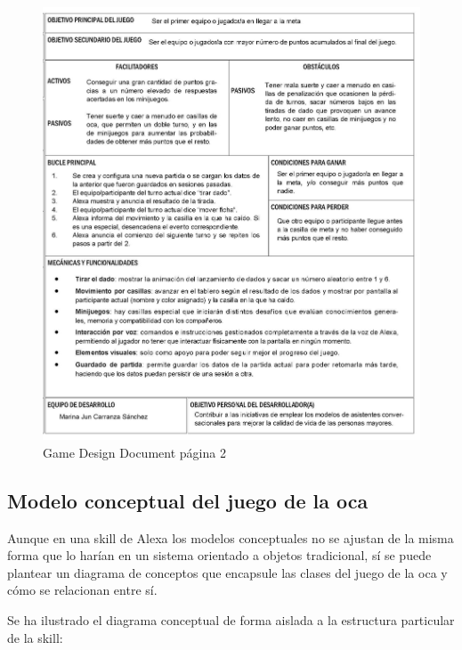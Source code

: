 \begin{figure}[H]
	\centering
	\includegraphics[width=1\textwidth]{imgs/GDD-2.jpg}
	\caption{Game Design Document página 2}
	\label{fig:GDD-2}
\end{figure}

\subsection{Modelo conceptual del juego de la oca}

Aunque en una skill de Alexa los modelos conceptuales no se ajustan de la misma forma que lo harían en un sistema orientado a objetos tradicional, sí se puede plantear un diagrama de conceptos que encapsule las clases del juego de la oca y cómo se relacionan entre sí.

Se ha ilustrado el diagrama conceptual de forma aislada a la estructura particular de la skill:

